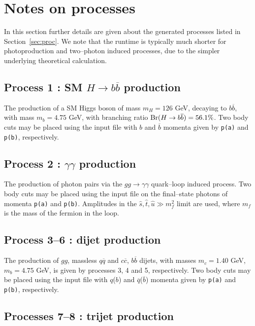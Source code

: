 \documentclass[12pt]{article}
\begin{document}
\section{Notes on processes}\label{sec:procnot}

In this section further details are given about the generated processes listed in Section~\ref{sec:proc}. We note that the runtime is typically much shorter for photoproduction and two--photon induced processes, due to the simpler underlying theoretical calculation.

\subsection{Process 1 : SM $H\to b\overline{b}$ production}

The production of a SM Higgs boson of mass $m_H=126$ GeV, decaying to $b\overline{b}$, with mass $m_b=4.75$ GeV, with branching ratio ${\rm Br}(H\to b\overline{b})=56.1\%$. Two body cuts may be placed using the input file with $b$ and $\overline{b}$ momenta given by \texttt{p(a)} and \texttt{p(b)}, respectively.

\subsection{Process 2 : $\gamma\gamma$ production}

The production of photon pairs via the $gg\to\gamma\gamma$ quark--loop induced process. Two body cuts may be placed using the input file on the final--state photons of momenta  \texttt{p(a)} and \texttt{p(b)}.  Amplitudes in the $\hat{s},\hat{t},\hat{u} \gg m_f^2$ limit are used, where $m_f$ is the mass of the fermion in the loop.

\subsection{Process 3--6 : dijet production}

The production of $gg$, massless $q\overline{q}$ and $c\overline{c}$, $b\overline{b}$ dijets, with masses $m_c=1.40$ GeV, $m_b=4.75$ GeV, is given by processes 3, 4 and 5, respectively. Two body cuts may be placed using the input file with $q$($b$) and $\overline{q}$($\overline{b}$) momenta given by \texttt{p(a)} and \texttt{p(b)}, respectively.

\subsection{Processes 7--8 : trijet production}
\end{document}

